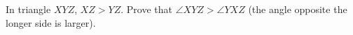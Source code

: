 In triangle $XYZ$, $XZ>YZ$. Prove that $\angle XYZ>\angle YXZ$ (the angle opposite the longer side is larger).
